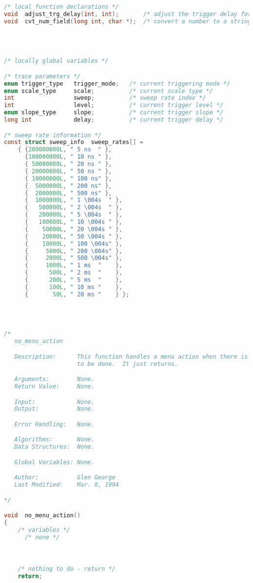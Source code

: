 \begin{lstlisting}[language=C]
/* local function declarations */
void  adjust_trg_delay(int, int);       /* adjust the trigger delay for new sweep */
void  cvt_num_field(long int, char *);	/* convert a number to a string */




/* locally global variables */

/* trace parameters */
enum trigger_type   trigger_mode;	/* current triggering mode */
enum scale_type     scale;	 		/* current scale type */
int		   			sweep;        	/* sweep rate index */
int		   			level;	 		/* current trigger level */
enum slope_type     slope;	 		/* current trigger slope */
long int	        delay;	 		/* current trigger delay */

/* sweep rate information */
const struct sweep_info  sweep_rates[] =
    { {200000000L, " 5 ns  " },
      {100000000L, " 10 ns " },
      { 50000000L, " 20 ns " },
      { 20000000L, " 50 ns " },
      { 10000000L, " 100 ns" },
      {  5000000L, " 200 ns" },
      {  2000000L, " 500 ns" },
      {  1000000L, " 1 \004s  " },
      {   500000L, " 2 \004s  " },
      {   200000L, " 5 \004s  " },
      {   100000L, " 10 \004s " },
      {    50000L, " 20 \004s " },
      {    20000L, " 50 \004s " },
      {    10000L, " 100 \004s" },
      {     5000L, " 200 \004s" },
      {     2000L, " 500 \004s" },
      {     1000L, " 1 ms  "    },
      {      500L, " 2 ms  "    },
      {      200L, " 5 ms  "    },
      {      100L, " 10 ms "    },
      {       50L, " 20 ms "    } };




/*
   no_menu_action

   Description:      This function handles a menu action when there is nothing
                     to be done.  It just returns.

   Arguments:        None.
   Return Value:     None.

   Input:            None.
   Output:           None.

   Error Handling:   None.

   Algorithms:       None.
   Data Structures:  None.

   Global Variables: None.

   Author:           Glen George
   Last Modified:    Mar. 8, 1994

*/

void  no_menu_action()
{
    /* variables */
      /* none */



    /* nothing to do - return */
    return;


\end{lstlisting}

